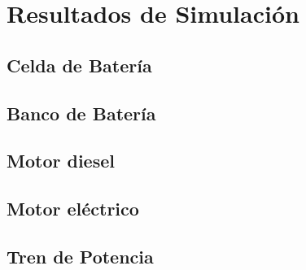 \chapter{Resultados de Simulación}

\section{Celda de Batería}

\section{Banco de Batería}

\section{Motor diesel}

\section{Motor eléctrico}

\section{Tren de Potencia}